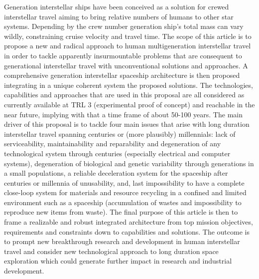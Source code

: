 Generation interstellar ships have been conceived as a solution for crewed interstellar travel aiming to bring relative numbers of humans to other star systems. Depending by the crew number generation ship’s total mass can vary wildly, constraining cruise velocity and travel time. The scope of this article is to propose a new and radical approach to human multigeneration interstellar travel in order to tackle apparently insurmountable problems that are consequent to generational interstellar travel with unconventional solutions and approaches. A comprehensive generation interstellar spaceship architecture is then proposed integrating in a unique coherent system the proposed solutions. The technologies, capabilities and approaches that are used in this proposal are all considered as currently available at TRL 3 (experimental proof of concept) and reachable in the near future, implying with that a time frame of about 50-100 years. The main driver of this proposal is to tackle four main issues that arise with long duration interstellar travel spanning centuries or (more plausibly) millennials: lack of serviceability, maintainability and reparability and degeneration of any technological system through centuries (especially electrical and computer systems), degeneration of biological and genetic variability through generations in a small populations, a reliable deceleration system for the spaceship after centuries or millennia of unusability, and, last impossibility to have a complete close-loop system for materials and resource recycling in a confined and limited environment such as a spaceship (accumulation of wastes and impossibility to reproduce new items from waste). The final purpose of this article is then to frame a realizable and robust integrated architecture from top mission objectives, requirements and constraints down to capabilities and solutions. The outcome is to prompt new breakthrough research and development in human interstellar travel and consider new technological approach to long duration space exploration which could generate further impact in research and industrial development.
